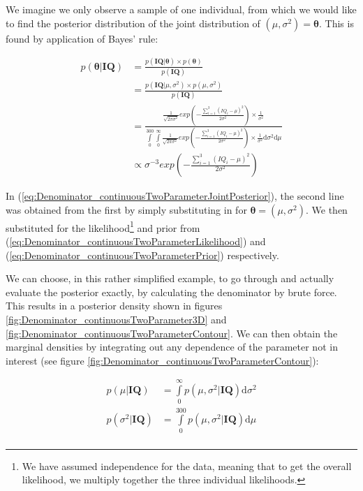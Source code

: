 \documentclass[11pt,fullpage]{book}
\begin{document}
We imagine we only observe a sample of one individual, from which we would like to find the posterior distribution of the joint distribution of $(\mu,\sigma^2)=\boldsymbol{\theta}$. This is found by application of Bayes' rule:

\begin{equation}\label{eq:Denominator_continuousTwoParameterJointPosterior}
\begin{align}
p(\boldsymbol{\theta}|\boldsymbol{IQ}) &= \frac{p(\boldsymbol{IQ}|\boldsymbol{\theta})\times p(\boldsymbol{\theta})}{p(\boldsymbol{IQ})}\\
&= \frac{p(\boldsymbol{IQ}|\mu,\sigma^2)\times p(\mu,\sigma^2)}{p(\boldsymbol{IQ})}\\
&= \frac{\frac{1}{\sqrt{2\pi\sigma^2}} exp\left(-\frac{\sum\limits_{i=1}^{3}(IQ_i-\mu)^2}{2\sigma^2}\right)\times\frac{1}{\sigma^2}}{\int\limits_{0}^{300}\int\limits_{0}^{\infty}\frac{1}{\sqrt{2\pi\sigma^2}} exp\left(-\frac{\sum\limits_{i=1}^{3}(IQ_i-\mu)^2}{2\sigma^2}\right)\times\frac{1}{\sigma^2}\mathrm{d}\sigma^2\mathrm{d}\mu}\\
&\propto \sigma^{-3} exp\left(-\frac{\sum\limits_{i=1}^{3}(IQ_i-\mu)^2}{2\sigma^2}\right)
\end{align}
\end{equation} 

In (\ref{eq:Denominator_continuousTwoParameterJointPosterior}), the second line was obtained from the first by simply substituting in for $\boldsymbol{\theta}=(\mu,\sigma^2)$. We then substituted for the likelihood\footnote{We have assumed independence for the data, meaning that to get the overall likelihood, we multiply together the three individual likelihoods.} and prior from (\ref{eq:Denominator_continuousTwoParameterLikelihood}) and (\ref{eq:Denominator_continuousTwoParameterPrior}) respectively. 

We can choose, in this rather simplified example, to go through and actually evaluate the posterior exactly, by calculating the denominator by brute force. This results in a posterior density shown in figures \ref{fig:Denominator_continuousTwoParameter3D} and \ref{fig:Denominator_continuousTwoParameterContour}. We can then obtain the marginal densities by integrating out any dependence of the parameter not in interest (see figure \ref{fig:Denominator_continuousTwoParameterContour}):


\begin{align}
p(\mu|\boldsymbol{IQ}) &= \int\limits_{0}^{\infty} p(\mu,\sigma^2|\boldsymbol{IQ}) \mathrm{d}\sigma^2\\
p(\sigma^2|\boldsymbol{IQ}) &= \int\limits_{0}^{300} p(\mu,\sigma^2|\boldsymbol{IQ}) \mathrm{d}\mu\\
\end{align}
\end{document}
